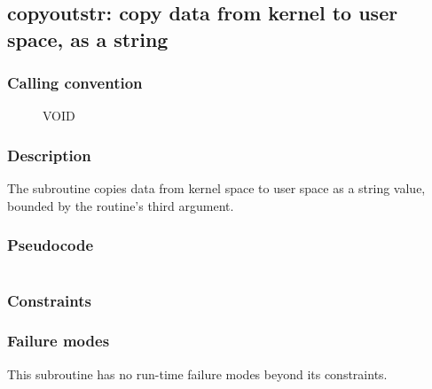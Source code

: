 \clearpage
{}
{}
\label{insn:dummy}
\subsection*{copyoutstr: copy data from kernel to user space, as a string}

\subsubsection*{Calling convention}

\begin{description}
\item[] VOID
\end{description}

\subsubsection*{Description}

The  subroutine copies data from kernel space
to user space as a string value, bounded by the routine's third argument.
\subsubsection*{Pseudocode}

\begin{verbatim}
\end{verbatim}

\subsubsection*{Constraints}

\subsubsection*{Failure modes}

This subroutine has no run-time failure modes beyond its constraints.
